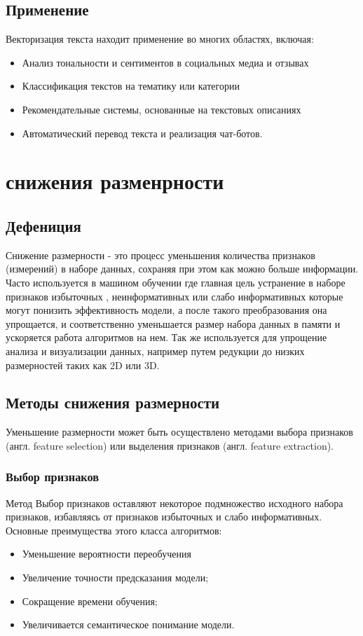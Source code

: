 	\subsection{Применение}
		Векторизация текста находит применение во многих областях, включая:
		\begin{itemize}
			\item Анализ тональности и сентиментов в социальных медиа и отзывах
			\item Классификация текстов на тематику или категории
			\item Рекомендательные системы, основанные на текстовых описаниях
			\item Автоматический перевод текста и реализация чат-ботов.
		\end{itemize}


\section{снижения разменрности}

	\subsection{Дефениция}
		Снижение размерности - это процесс уменьшения количества признаков (измерений) в наборе данных, сохраняя при этом как можно больше информации. Часто используется в машином обучении где главная цель устранение в наборе  признаков избыточных , неинформативных или слабо информативных которые могут  понизить эффективность модели, а после такого преобразования она упрощается, и соответственно уменьшается размер набора данных в памяти и ускоряется работа алгоритмов на нем. Так же используется для упрощение анализа и визуализации данных, например путем редукции до низких размерностей таких как 2D или 3D. \cite{DimensionReduction}

	\subsection{Методы снижения размерности}
		Уменьшение размерности может быть осуществлено методами выбора признаков (англ. feature selection) или выделения признаков (англ. feature extraction).
		
		\subsubsection{Выбор признаков}
			Метод Выбор признаков оставляют некоторое подмножество исходного набора признаков, избавляясь от признаков избыточных и слабо информативных. Основные преимущества этого класса алгоритмов:
			\begin{itemize}
				\item Уменьшение вероятности переобучения
				\item Увеличение точности предсказания модели;
				\item Сокращение времени обучения;
				\item Увеличивается семантическое понимание модели.\\
			\end{itemize}
		
